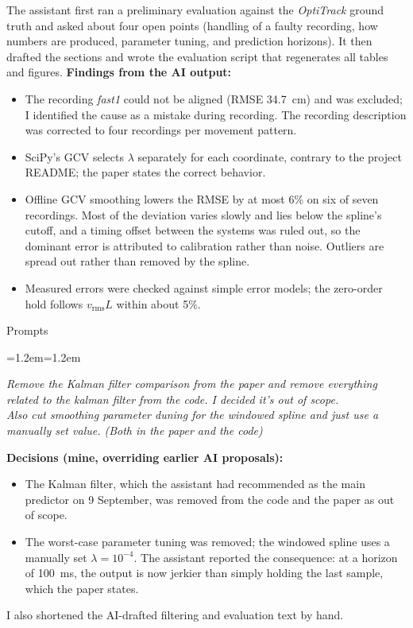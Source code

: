 \documentclass[11pt,a4paper]{article}
\newenvironment{prompt}[1]
  {\par\smallskip\noindent\textsf{\small #1}\par\nopagebreak
   \begin{list}{}{\leftmargin=1.2em\rightmargin=1.2em}\item\itshape\small}
  {\end{list}\smallskip}
\begin{document}
The assistant first ran a preliminary evaluation against the \emph{OptiTrack} ground truth and asked about four open points (handling of a faulty recording, how numbers are produced, parameter tuning, and prediction horizons).
It then drafted the sections and wrote the evaluation script that regenerates all tables and figures.
\textbf{Findings from the AI output:}
\begin{itemize}
  \item The recording \emph{fast1} could not be aligned (RMSE 34.7~cm) and was excluded; I identified the cause as a mistake during recording.
    The recording description was corrected to four recordings per movement pattern.
  \item SciPy's GCV selects $\lambda$ separately for each coordinate, contrary to the project README; the paper states the correct behavior.
  \item Offline GCV smoothing lowers the RMSE by at most 6\% on six of seven recordings.
    Most of the deviation varies slowly and lies below the spline's cutoff, and a timing offset between the systems was ruled out, so the dominant error is attributed to calibration rather than noise.
    Outliers are spread out rather than removed by the spline.
  \item Measured errors were checked against simple error models; the zero-order hold follows $v_{\text{rms}} L$ within about 5\%.
\end{itemize}

\begin{prompt}{Prompts}
Remove the Kalman filter comparison from the paper and remove everything related to the kalman filter from the code. I decided it's out of scope.\\[2pt]
Also cut smoothing parameter duning for the windowed spline and just use a manually set value. (Both in the paper and the code)
\end{prompt}

\textbf{Decisions (mine, overriding earlier AI proposals):}
\begin{itemize}
  \item The Kalman filter, which the assistant had recommended as the main predictor on 9 September, was removed from the code and the paper as out of scope.
  \item The worst-case parameter tuning was removed; the windowed spline uses a manually set $\lambda = 10^{-4}$.
    The assistant reported the consequence: at a horizon of 100~ms, the output is now jerkier than simply holding the last sample, which the paper states.
\end{itemize}
I also shortened the AI-drafted filtering and evaluation text by hand.
\end{document}
